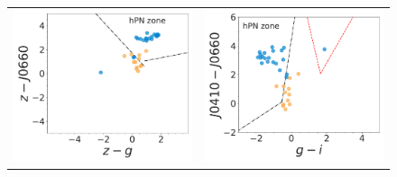 \documentclass[11pt]{article}
\newcommand\raiselabel[1]{\raisebox{0.9\figwidth}[-0.5\figwidth]{#1}}
\begin{document}
\begin{figure}
\begin{tabular}{l l}
\includegraphics[width=0.5\linewidth, trim=10 10 10 10, clip]{Fig3-pne-smc-splus-match-2007-compat-HIIRegions-smc-match-splus-z.pdf} & \includegraphics[width=0.5\linewidth, trim=10 10 10 10, clip]{Fig5-pne-smc-splus-match-2007-compat-HIIRegions-smc-match-splus-gi.pdf} \\
\end{tabular}
\caption{}
\label{fig:smppne}
\end{figure}
  
\newpage
\begin{longtable}{ccc}
  
\end{longtable} 
\end{document}
